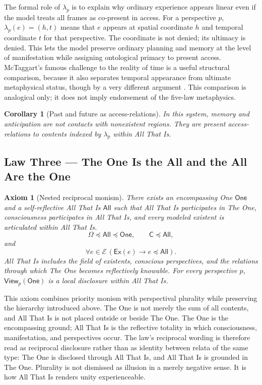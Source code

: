 \documentclass[11pt]{article}
\newtheorem{axiom}{Axiom}
\newtheorem{corollary}{Corollary}
\newcommand{\Ex}{\mathsf{Ex}}
\newcommand{\One}{\mathsf{One}}
\newcommand{\All}{\mathsf{All}}
\newcommand{\Consc}{\mathsf{C}}
\newcommand{\Ent}{\mathcal{E}}
\newcommand{\View}{\mathsf{View}}
\newcommand{\Ground}{\preceq}
\begin{document}
The formal role of $\lambda_p$ is to explain why ordinary experience appears linear even if the model treats all frames as co-present in access.  For a perspective $p$, $\lambda_p(e)=(h,t)$ means that $e$ appears at spatial coordinate $h$ and temporal coordinate $t$ for that perspective.  The coordinate is not denied; its ultimacy is denied.  This lets the model preserve ordinary planning and memory at the level of manifestation while assigning ontological primacy to present access.  McTaggart's famous challenge to the reality of time is a useful structural comparison, because it also separates temporal appearance from ultimate metaphysical status, though by a very different argument \cite{McTaggart1908}.  This comparison is analogical only; it does not imply endorsement of the five-law metaphysics.

\begin{corollary}[Past and future as access-relations]
In this system, memory and anticipation are not contacts with nonexistent regions.  They are present access-relations to contents indexed by $\lambda_p$ within All That Is.
\end{corollary}

\subsection{Law Three --- The One Is the All and the All Are the One}

\begin{axiom}[Nested reciprocal monism]
There exists an encompassing One $\One$ and a self-reflective All That Is $\All$ such that All That Is participates in The One, consciousness participates in All That Is, and every modeled existent is articulated within All That Is.
\[
\Omega\Ground\All\Ground\One,
\qquad
\Consc\Ground\All,
\]
and
\[
\forall e\in\Ent\,(\Ex(e)\rightarrow e\Ground\All).
\]
All That Is includes the field of existents, conscious perspectives, and the relations through which The One becomes reflectively knowable.  For every perspective $p$, $\View_p(\One)$ is a local disclosure within All That Is.
\end{axiom}

This axiom combines priority monism with perspectival plurality while preserving the hierarchy introduced above.  The One is not merely the sum of all contents, and All That Is is not placed outside or beside The One.  The One is the encompassing ground; All That Is is the reflective totality in which consciousness, manifestation, and perspectives occur.  The law's reciprocal wording is therefore read as reciprocal disclosure rather than as identity between relata of the same type: The One is disclosed through All That Is, and All That Is is grounded in The One.  Plurality is not dismissed as illusion in a merely negative sense.  It is how All That Is renders unity experienceable.
\end{document}
